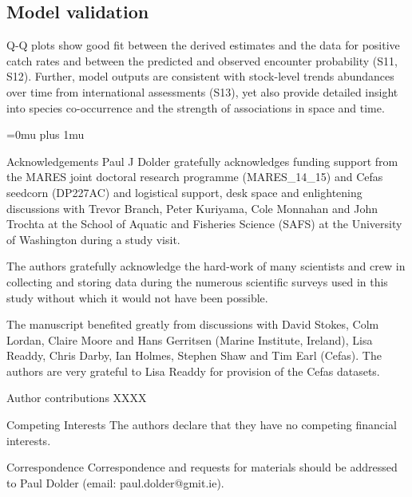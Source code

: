 \documentclass{nature}
\begin{document}
\subsection{Model validation}

Q-Q plots show good fit between the derived estimates and the data for positive
catch rates and between the predicted and observed encounter probability (S11,
S12).  Further, model outputs are consistent with stock-level trends abundances
over time from international assessments (S13), yet also provide detailed
insight into species co-occurrence and the strength of associations in space
and time. 

\newpage
\Urlmuskip=0mu plus 1mu\relax

\small{}


\newpage


\begin{addendum}
 \item [Acknowledgements] Paul J Dolder gratefully acknowledges funding support
	 from the MARES joint doctoral research programme (MARES\_14\_15) and
	 Cefas seedcorn (DP227AC) and logistical support, desk space and
	 enlightening discussions with Trevor Branch, Peter Kuriyama, Cole
	 Monnahan and John Trochta at the School of Aquatic and Fisheries
	 Science (SAFS) at the University of Washington during a study visit.
	 
	 The authors gratefully acknowledge the hard-work of many scientists
	 and crew in collecting and storing data during the numerous scientific
	 surveys used in this study without which it would not have been
	 possible.  
	 
	 The manuscript benefited greatly from discussions with David Stokes,
	 Colm Lordan, Claire Moore and Hans Gerritsen (Marine Institute,
	 Ireland), Lisa Readdy, Chris Darby, Ian Holmes, Stephen Shaw and Tim
	 Earl (Cefas).  The authors are very grateful to Lisa Readdy for
	 provision of the Cefas datasets.

 \item[Author contributions] XXXX

 \item[Competing Interests] The authors declare that they have
	 no competing financial interests.
 \item[Correspondence] Correspondence and requests for materials
 should be addressed to Paul Dolder (email: paul.dolder@gmit.ie).
 \end{addendum}
\end{document}
